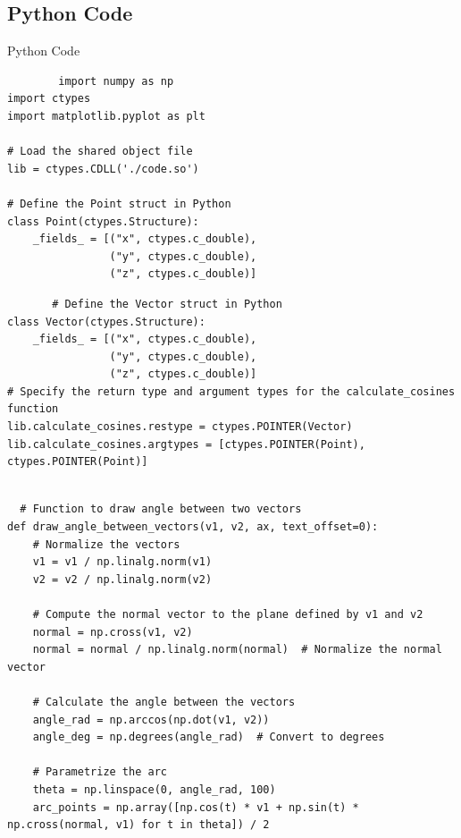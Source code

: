 \documentclass{beamer}
\theoremstyle{remark}
\begin{document}
\subsection{Python Code}
\begin{frame}[fragile]{Python Code}
	\begin{verbatim}
		import numpy as np
import ctypes
import matplotlib.pyplot as plt

# Load the shared object file
lib = ctypes.CDLL('./code.so')

# Define the Point struct in Python
class Point(ctypes.Structure):
    _fields_ = [("x", ctypes.c_double),
                ("y", ctypes.c_double),
                ("z", ctypes.c_double)]

    \end{verbatim}
\end{frame}
\begin{frame}[fragile]
	\begin{verbatim}
       # Define the Vector struct in Python
class Vector(ctypes.Structure):
    _fields_ = [("x", ctypes.c_double),
                ("y", ctypes.c_double),
                ("z", ctypes.c_double)]
# Specify the return type and argument types for the calculate_cosines function
lib.calculate_cosines.restype = ctypes.POINTER(Vector)
lib.calculate_cosines.argtypes = [ctypes.POINTER(Point), ctypes.POINTER(Point)]


    \end{verbatim}
\end{frame}
\begin{frame}[fragile]
	 \begin{verbatim}
  # Function to draw angle between two vectors
def draw_angle_between_vectors(v1, v2, ax, text_offset=0):
    # Normalize the vectors
    v1 = v1 / np.linalg.norm(v1)
    v2 = v2 / np.linalg.norm(v2)

    # Compute the normal vector to the plane defined by v1 and v2
    normal = np.cross(v1, v2)
    normal = normal / np.linalg.norm(normal)  # Normalize the normal vector

    # Calculate the angle between the vectors
    angle_rad = np.arccos(np.dot(v1, v2))
    angle_deg = np.degrees(angle_rad)  # Convert to degrees

    # Parametrize the arc
    theta = np.linspace(0, angle_rad, 100)
    arc_points = np.array([np.cos(t) * v1 + np.sin(t) * np.cross(normal, v1) for t in theta]) / 2


    \end{verbatim}
\end{frame}
\end{document}
